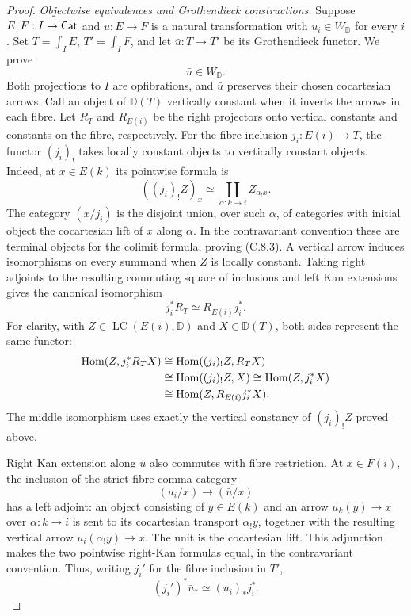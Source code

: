\begin{proof}
\emph{Objectwise equivalences and Grothendieck constructions.}
Suppose $E,F:I\to\mathsf{Cat}$ and $u:E\to F$ is a natural
transformation with $u_i\in W_{\mathbb D}$ for every $i$.
Set $T=\int_I E$, $T'=\int_I F$, and let $\bar u:T\to T'$
be its Grothendieck functor. We prove
\[
 \bar u\in W_{\mathbb D}.
 \tag{C.8.2}
\]
Both projections to $I$ are opfibrations, and $\bar u$
preserves their chosen cocartesian arrows. Call an object of
$\mathbb D(T)$ vertically constant when it inverts the arrows
in each fibre. Let $R_T$ and $R_{E(i)}$ be the right projectors
onto vertical constants and constants on the fibre, respectively.
For the fibre inclusion $j_i:E(i)\to T$, the functor
$(j_i)_!$ takes locally constant objects to vertically constant
objects. Indeed, at $x\in E(k)$ its pointwise formula is
\[
 ((j_i)_!Z)_x\simeq
 \coprod_{\alpha:k\to i}Z_{\alpha_!x}.
 \tag{C.8.3}
\]
The category $(x/j_i)$ is the disjoint union, over such
$\alpha$, of categories with initial object the cocartesian
lift of $x$ along $\alpha$. In the contravariant convention
these are terminal objects for the colimit formula, proving
(C.8.3). A vertical arrow induces isomorphisms on every summand
when $Z$ is locally constant. Taking right adjoints to the
resulting commuting square of inclusions and left Kan
extensions gives the canonical isomorphism
\[
 j_i^* R_T\simeq R_{E(i)}j_i^*.
 \tag{C.8.4}
\]
For clarity, with $Z\in\operatorname{LC}(E(i),\mathbb D)$
and $X\in\mathbb D(T)$, both sides represent the same functor:
\[
\begin{aligned}
 \operatorname{Hom}(Z,j_i^*R_TX)
 &\cong\operatorname{Hom}((j_i)_!Z,R_TX)\\
 &\cong\operatorname{Hom}((j_i)_!Z,X)
 \cong\operatorname{Hom}(Z,j_i^*X)\\
 &\cong\operatorname{Hom}(Z,R_{E(i)}j_i^*X).
\end{aligned}
\]
The middle isomorphism uses exactly the vertical constancy
of $(j_i)_!Z$ proved above.

Right Kan extension along $\bar u$ also commutes with fibre
restriction. At $x\in F(i)$, the inclusion of the strict-fibre
comma category
\[
 (u_i/x)\longrightarrow(\bar u/x)
\]
has a left adjoint: an object consisting of $y\in E(k)$ and
an arrow $u_k(y)\to x$ over $\alpha:k\to i$ is sent to its
cocartesian transport $\alpha_!y$, together with the resulting
vertical arrow $u_i(\alpha_!y)\to x$. The unit is the
cocartesian lift. This adjunction makes the two pointwise
right-Kan formulas equal, in the contravariant convention.
Thus, writing $j_i'$ for the fibre inclusion in $T'$,
\[
 (j_i')^*\bar u_*\simeq (u_i)_*j_i^*.
 \tag{C.8.5}
\]


\end{proof}
